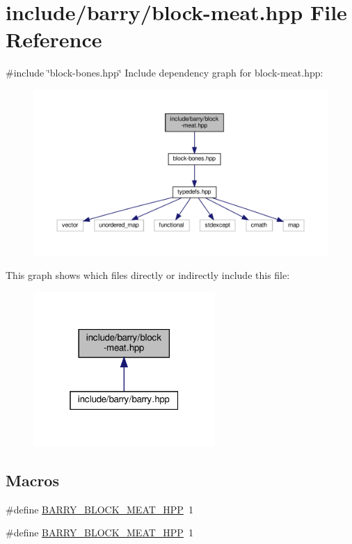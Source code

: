 \hypertarget{block-meat_8hpp}{}\section{include/barry/block-\/meat.hpp File Reference}
\label{block-meat_8hpp}
{\ttfamily \#include \char`\"{}block-\/bones.\+hpp\char`\"{}}\newline
Include dependency graph for block-\/meat.hpp\+:\nopagebreak
\begin{figure}[H]
\begin{center}
\leavevmode
\includegraphics[width=350pt]{block-meat_8hpp__incl}
\end{center}
\end{figure}
This graph shows which files directly or indirectly include this file\+:\nopagebreak
\begin{figure}[H]
\begin{center}
\leavevmode
\includegraphics[width=196pt]{block-meat_8hpp__dep__incl}
\end{center}
\end{figure}
\subsection*{Macros}
\begin{DoxyCompactItemize}
\item 
\#define \hyperlink{barry_8hpp_ad32bbe588fc2f7e5cfbfa9a737eb67a4}{B\+A\+R\+R\+Y\+\_\+\+B\+L\+O\+C\+K\+\_\+\+M\+E\+A\+T\+\_\+\+H\+PP}~1
\item 
\#define \hyperlink{block-meat_8hpp_ad32bbe588fc2f7e5cfbfa9a737eb67a4}{B\+A\+R\+R\+Y\+\_\+\+B\+L\+O\+C\+K\+\_\+\+M\+E\+A\+T\+\_\+\+H\+PP}~1
\end{DoxyCompactItemize}
